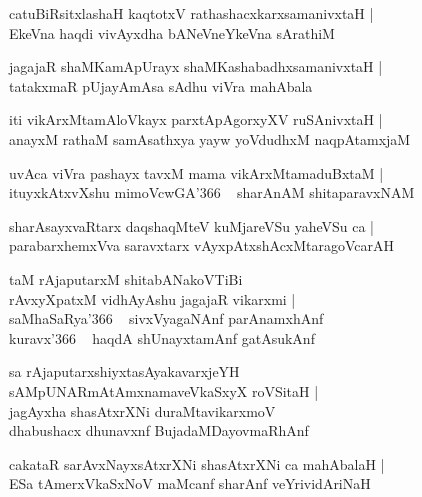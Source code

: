 \documentclass[twoside,12pt,openright]{book}
\newcounter{shloka}[chapter]
\begin{document}
\begin{shloka}%
catuBiRsitxlashaH kaqtotxV rathashacxkarxsamanivxtaH |\\
EkeVna haqdi vivAyxdha bANeVneYkeVna sArathiM 
\end{shloka}

\begin{shloka}%
jagajaR shaMKamApUrayx shaMKashabadhxsamanivxtaH |\\
tatakxmaR pUjayAmAsa sAdhu viVra mahAbala 
\end{shloka}

\begin{shloka}%
iti vikArxMtamAloVkayx parxtApAgorxyXV ruSAnivxtaH |\\
anayxM rathaM samAsathxya yayw yoVdudhxM naqpAtamxjaM 
\end{shloka}


\begin{shloka}%
uvAca viVra pashayx tavxM mama vikArxMtamaduBxtaM |\\
ituyxkAtxvXshu mimoVcwGA\char'366 ~ sharAnAM  shitaparavxNAM 
\end{shloka}

\begin{shloka}%
sharAsayxvaRtarx daqshaqMteV kuMjareVSu yaheVSu ca |\\
parabarxhemxVva saravxtarx vAyxpAtxshAcxMtaragoVcarAH 
\end{shloka}

\begin{shloka}%
taM rAjaputarxM shitabANakoVTiBi \\
rAvxyXpatxM vidhAyAshu jagajaR vikarxmi |\\
saMhaSaRya\char'366 ~ sivxVyagaNAnf parAnamxhAnf \\
kuravx\char'366 ~ haqdA shUnayxtamAnf gatAsukAnf 
\end{shloka}

\begin{shloka}%
sa rAjaputarxshiyxtasAyakavarxjeYH \\
sAMpUNARmAtAmxnamaveVkaSxyX roVSitaH |\\
jagAyxha shasAtxrXNi duraMtavikarxmoV \\
dhabushacx dhunavxnf BujadaMDayovmaRhAnf 
\end{shloka}

\begin{shloka}%
cakataR sarAvxNayxsAtxrXNi shasAtxrXNi ca mahAbalaH |\\
ESa tAmerxVkaSxNoV maMcanf sharAnf veYrividAriNaH 
\end{shloka}
\end{document}
